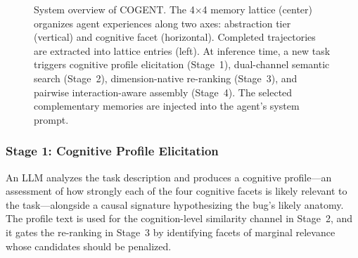 \documentclass[letterpaper]{article} %
\begin{document}
\begin{figure}[t]
\caption{System overview of \textsc{COGENT}. The 4$\times$4 memory lattice (center) organizes agent experiences along two axes: abstraction tier (vertical) and cognitive facet (horizontal). Completed trajectories are extracted into lattice entries (left). At inference time, a new task triggers cognitive profile elicitation (Stage~1), dual-channel semantic search (Stage~2), dimension-native re-ranking (Stage~3), and pairwise interaction-aware assembly (Stage~4). The selected complementary memories are injected into the agent's system prompt.}
\label{fig:architecture}
\end{figure}

\subsubsection{Stage 1: Cognitive Profile Elicitation}

An LLM analyzes the task description and produces a cognitive profile---an assessment of how strongly each of the four cognitive facets is likely relevant to the task---alongside a causal signature hypothesizing the bug's likely anatomy. The profile text is used for the cognition-level similarity channel in Stage~2, and it gates the re-ranking in Stage~3 by identifying facets of marginal relevance whose candidates should be penalized.
\end{document}
